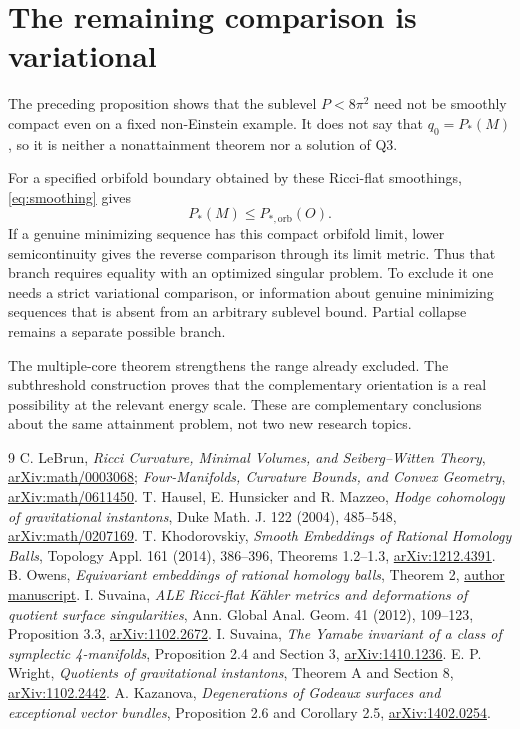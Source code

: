 \documentclass[11pt]{article}
\newcommand{\orb}{\mathrm{orb}}
\begin{document}
\section{The remaining comparison is variational}
The preceding proposition shows that the sublevel $P<8\pi^2$ need not be
smoothly compact even on a fixed non-Einstein example. It does not say that
$q_0=P_*(M)$, so it is neither a nonattainment theorem nor a solution of Q3.

For a specified orbifold boundary obtained by these Ricci-flat smoothings,
\eqref{eq:smoothing} gives
\[
 P_*(M)\le P_{*,\orb}(O).
\]
If a genuine minimizing sequence has this compact orbifold limit, lower
semicontinuity gives the reverse comparison through its limit metric.
Thus that branch requires equality with an optimized singular problem.
To exclude it one needs a strict variational comparison, or information
about genuine minimizing sequences that is absent from an arbitrary
sublevel bound. Partial collapse remains a separate possible branch.

The multiple-core theorem strengthens the range already excluded. The
subthreshold construction proves that the complementary orientation is a
real possibility at the relevant energy scale. These are complementary
conclusions about the same attainment problem, not two new research topics.

\begin{thebibliography}{9}
 C. LeBrun, \emph{Ricci Curvature, Minimal Volumes, and
Seiberg--Witten Theory}, \href{https://arxiv.org/abs/math/0003068}{arXiv:math/0003068};
\emph{Four-Manifolds, Curvature Bounds, and Convex Geometry},
\href{https://arxiv.org/abs/math/0611450}{arXiv:math/0611450}.
 T. Hausel, E. Hunsicker and R. Mazzeo,
\emph{Hodge cohomology of gravitational instantons}, Duke Math. J. 122
(2004), 485--548, \href{https://arxiv.org/abs/math/0207169}{arXiv:math/0207169}.
 T. Khodorovskiy, \emph{Smooth Embeddings of Rational Homology
Balls}, Topology Appl. 161 (2014), 386--396, Theorems 1.2--1.3,
\href{https://arxiv.org/abs/1212.4391}{arXiv:1212.4391}.
 B. Owens, \emph{Equivariant embeddings of rational homology
balls}, Theorem 2, \href{https://www.maths.gla.ac.uk/~bowens/papers/balls.pdf}{author manuscript}.
 I. Suvaina, \emph{ALE Ricci-flat K\"ahler metrics and
deformations of quotient surface singularities}, Ann. Global Anal. Geom. 41
(2012), 109--123, Proposition 3.3,
\href{https://arxiv.org/abs/1102.2672}{arXiv:1102.2672}.
 I. Suvaina, \emph{The Yamabe invariant of a class of
symplectic 4-manifolds}, Proposition 2.4 and Section 3,
\href{https://arxiv.org/abs/1410.1236}{arXiv:1410.1236}.
 E. P. Wright, \emph{Quotients of gravitational instantons},
Theorem A and Section 8, \href{https://arxiv.org/abs/1102.2442}{arXiv:1102.2442}.
 A. Kazanova, \emph{Degenerations of Godeaux surfaces and
exceptional vector bundles}, Proposition 2.6 and Corollary 2.5,
\href{https://arxiv.org/abs/1402.0254}{arXiv:1402.0254}.
\end{thebibliography}
\end{document}
